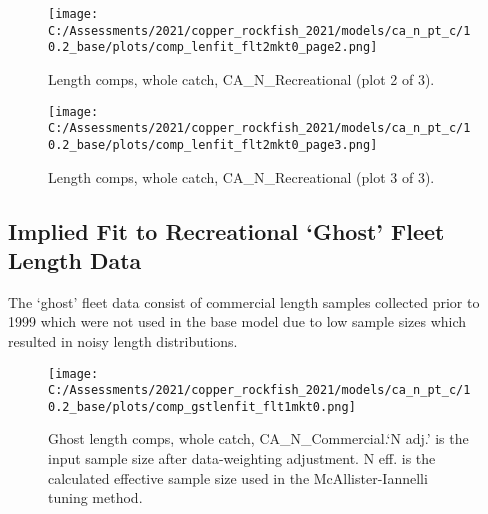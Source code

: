 \documentclass[11pt,
  english,
  a4paper,
]{article}
\begin{document}
\tagmcend\tagstructend


\begin{figure}
\centering
\texttt{[image: C:/Assessments/2021/copper\_rockfish\_2021/models/ca\_n\_pt\_c/10.2\_base/plots/comp\_lenfit\_flt2mkt0\_page2.png]}
\caption{Length comps, whole catch, CA\_N\_Recreational (plot 2 of 3).\label{fig:comp_lenfit_flt2mkt0_page2}}
\end{figure}

\tagmcend\tagstructend


\begin{figure}
\centering
\texttt{[image: C:/Assessments/2021/copper\_rockfish\_2021/models/ca\_n\_pt\_c/10.2\_base/plots/comp\_lenfit\_flt2mkt0\_page3.png]}
\caption{Length comps, whole catch, CA\_N\_Recreational (plot 3 of 3).\label{fig:comp_lenfit_flt2mkt0_page3}}
\end{figure}

\tagmcend\tagstructend

\newpage


\hypertarget{implied-fit-to-recreational-ghost-fleet-length-data}{%
\subsection{Implied Fit to Recreational `Ghost' Fleet Length Data}\label{implied-fit-to-recreational-ghost-fleet-length-data}}

\leavevmode\tagmcend\tagstructend


The `ghost' fleet data consist of commercial length samples collected prior to 1999 which were not used in the base model due to low sample sizes which resulted in noisy length distributions.

\leavevmode\tagmcend\tagstructend\par


\begin{figure}
\centering
\texttt{[image: C:/Assessments/2021/copper\_rockfish\_2021/models/ca\_n\_pt\_c/10.2\_base/plots/comp\_gstlenfit\_flt1mkt0.png]}
\caption{Ghost length comps, whole catch, CA\_N\_Commercial.`N adj.' is the input sample size after data-weighting adjustment. N eff. is the calculated effective sample size used in the McAllister-Iannelli tuning method.\label{fig:comp_gstlenfit_flt1mkt0}}
\end{figure}

\tagmcend\tagstructend
\end{document}
